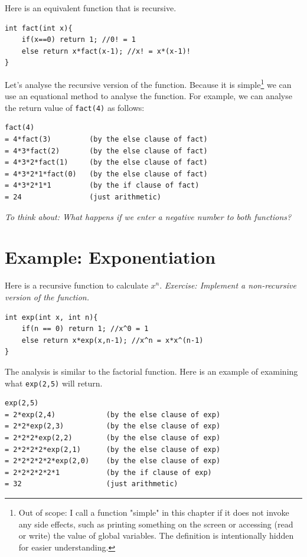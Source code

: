 Here is an equivalent function that is recursive.

\begin{lstlisting}
int fact(int x){
    if(x==0) return 1; //0! = 1
    else return x*fact(x-1); //x! = x*(x-1)!
}
\end{lstlisting}

Let's analyse the recursive version of the function. Because it is simple\footnote{Out of scope: I call a function "simple" in this chapter if it does not invoke any side effects, such as printing something on the screen or accessing (read or write) the value of global variables. The definition is intentionally hidden for easier understanding.} we can use an equational method to analyse the function. For example, we can analyse the return value of \texttt{fact(4)} as follows:

\begin{lstlisting}
fact(4)
= 4*fact(3)         (by the else clause of fact)
= 4*3*fact(2)       (by the else clause of fact)
= 4*3*2*fact(1)     (by the else clause of fact)
= 4*3*2*1*fact(0)   (by the else clause of fact)
= 4*3*2*1*1         (by the if clause of fact)
= 24                (just arithmetic)
\end{lstlisting}

\textit{To think about: What happens if we enter a negative number to both functions?}

\section{Example: Exponentiation}

Here is a recursive function to calculate $x^n$. \textit{Exercise: Implement a non-recursive version of the function.}

\begin{lstlisting}
int exp(int x, int n){
    if(n == 0) return 1; //x^0 = 1
    else return x*exp(x,n-1); //x^n = x*x^(n-1)
}
\end{lstlisting}

The analysis is similar to the factorial function. Here is an example of examining what \texttt{exp(2,5)} will return.

\begin{lstlisting}
exp(2,5)
= 2*exp(2,4)            (by the else clause of exp)
= 2*2*exp(2,3)          (by the else clause of exp)
= 2*2*2*exp(2,2)        (by the else clause of exp)
= 2*2*2*2*exp(2,1)      (by the else clause of exp)
= 2*2*2*2*2*exp(2,0)    (by the else clause of exp)
= 2*2*2*2*2*1           (by the if clause of exp)
= 32                    (just arithmetic)
\end{lstlisting}

